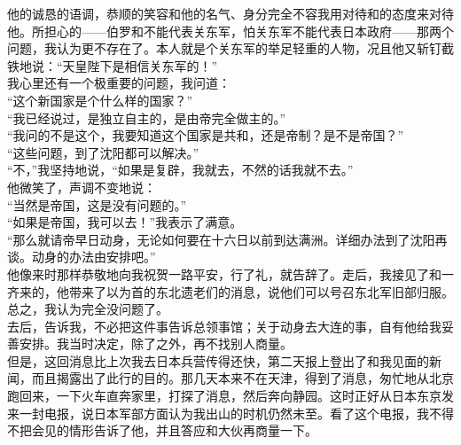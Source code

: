 他的诚恳的语调，恭顺的笑容和他的名气、身分完全不容我用对待和的态度来对待他。所担心的——伯罗和不能代表关东军，怕关东军不能代表日本政府——那两个问题，我认为更不存在了。本人就是个关东军的举足轻重的人物，况且他又斩钉截铁地说：“天皇陛下是相信关东军的！”\\

我心里还有一个极重要的问题，我问道：\\

“这个新国家是个什么样的国家？”\\

“我已经说过，是独立自主的，是由帝完全做主的。”\\

“我问的不是这个，我要知道这个国家是共和，还是帝制？是不是帝国？”\\

“这些问题，到了沈阳都可以解决。”\\

“不，”我坚持地说，“如果是复辟，我就去，不然的话我就不去。”\\

他微笑了，声调不变地说：\\

“当然是帝国，这是没有问题的。”\\

“如果是帝国，我可以去！”我表示了满意。\\

“那么就请帝早日动身，无论如何要在十六日以前到达满洲。详细办法到了沈阳再谈。动身的办法由安排吧。”\\

他像来时那样恭敬地向我祝贺一路平安，行了礼，就告辞了。走后，我接见了和一齐来的，他带来了以为首的东北遗老们的消息，说他们可以号召东北军旧部归服。总之，我认为完全没问题了。\\

去后，告诉我，不必把这件事告诉总领事馆；关于动身去大连的事，自有他给我妥善安排。我当时决定，除了之外，再不找别人商量。\\

但是，这回消息比上次我去日本兵营传得还快，第二天报上登出了和我见面的新闻，而且揭露出了此行的目的。那几天本来不在天津，得到了消息，匆忙地从北京跑回来，一下火车直奔家里，打探了消息，然后奔向静园。这时正好从日本东京发来一封电报，说日本军部方面认为我出山的时机仍然未至。看了这个电报，我不得不把会见的情形告诉了他，并且答应和大伙再商量一下。\\

